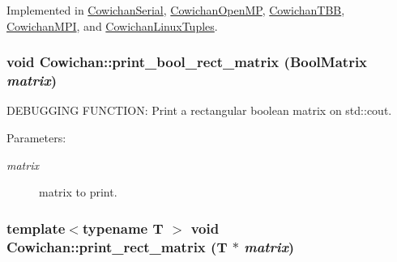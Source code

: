 Implemented in \hyperlink{class_cowichan_serial_05f6899081a457d58978e4f6bda2db6a}{CowichanSerial}, \hyperlink{class_cowichan_open_m_p_99a0570f754ac82968d73093476de533}{CowichanOpenMP}, \hyperlink{class_cowichan_t_b_b_92a763b9733cdcceda13b7b7ea0bc229}{CowichanTBB}, \hyperlink{class_cowichan_m_p_i_39fcc8a331b0e26438fbf43fa01cf7c1}{CowichanMPI}, and \hyperlink{class_cowichan_linux_tuples_b16e1c3b60f920c12460a74289558dcb}{CowichanLinuxTuples}.\hypertarget{class_cowichan_c3470807a8cdd1bfc6cf89f864f330bc}{
\subsubsection[{print\_\-bool\_\-rect\_\-matrix}]{\setlength{\rightskip}{0pt plus 5cm}void Cowichan::print\_\-bool\_\-rect\_\-matrix ({\bf BoolMatrix} {\em matrix})}}
\label{class_cowichan_c3470807a8cdd1bfc6cf89f864f330bc}


DEBUGGING FUNCTION: Print a rectangular boolean matrix on std::cout. \begin{Desc}
\item[Parameters:]
\begin{description}
\item[{\em matrix}]matrix to print. \end{description}
\end{Desc}
\hypertarget{class_cowichan_14e706ef5a5f7661a623c595d7ed76f1}{
\subsubsection[{print\_\-rect\_\-matrix}]{\setlength{\rightskip}{0pt plus 5cm}template$<$typename T $>$ void Cowichan::print\_\-rect\_\-matrix (T $\ast$ {\em matrix})}}
\label{class_cowichan_14e706ef5a5f7661a623c595d7ed76f1}


